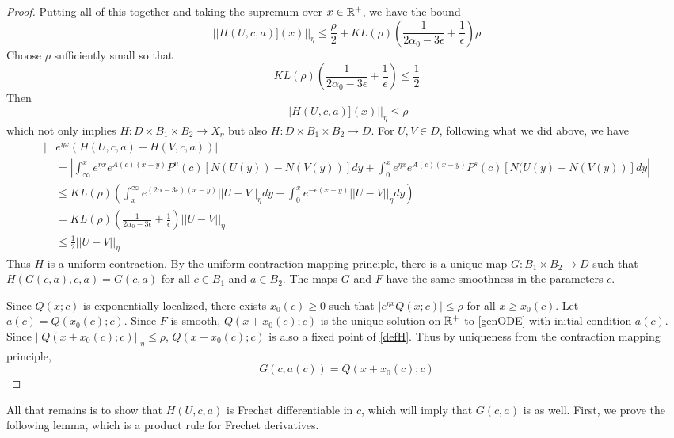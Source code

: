 \documentclass[thesis.tex]{subfiles}
\begin{document}
\begin{lemma}
\begin{proof}
Putting all of this together and taking the supremum over $x \in \mathbb{R}^+$, we have the bound
\begin{equation*}
||H(U, c, a)](x)||_\eta \leq \frac{\rho}{2} + K L(\rho) \left( \frac{1}{2 \alpha_0 - 3 \epsilon} + \frac{1}{\epsilon} \right) \rho
\end{equation*}
Choose $\rho$ sufficiently small so that 
\[
K L(\rho) \left( \frac{1}{2 \alpha_0 - 3 \epsilon} + \frac{1}{\epsilon} \right) \leq \frac{1}{2}
\]
Then 
\[
||H(U, c, a)](x)||_\eta \leq \rho
\]
which not only implies $H: D \times B_1 \times B_2 \rightarrow X_\eta$ but also $H: D \times B_1 \times B_2 \rightarrow D$. For $U, V \in D$, following what we did above, we have
\begin{align*}
| &e^{\eta x} ( H(U, c, a) - H(V, c, a) ) | \\
&= \left| \int_\infty^x e^{\eta x} e^{A(c)(x - y)}P^u(c) [N(U(y)) - N(V(y))]dy + \int_0^x e^{\eta x} e^{A(c)(x - y)}P^s(c)[N(U(y)- N(V(y))]dy \right| \\
&\leq K L(\rho) \left( \int_x^\infty e^{(2 \alpha - 3 \epsilon)(x-y)}||U - V||_\eta dy + \int_0^x e^{-\epsilon(x-y)}||U - V||_\eta dy \right) \\
&= K L(\rho) \left( \frac{1}{2 \alpha_0 - 3 \epsilon} + \frac{1}{\epsilon} \right) ||U - V||_\eta  \\
&\leq \frac{1}{2} ||U - V||_\eta 
\end{align*}
Thus $H$ is a uniform contraction. By the uniform contraction mapping principle, there is a unique map $G: B_1 \times B_2 \rightarrow D$ such that $H(G(c, a), c, a) = G(c, a)$ for all $c \in B_1$ and $a \in B_2$. The maps $G$ and $F$ have the same smoothness in the parameters $c$. 

Since $Q(x; c)$ is exponentially localized, there exists $x_0(c) \geq 0$ such that $|e^{\eta x} Q(x; c)| \leq \rho$ for all $x \geq x_0(c)$. Let $a(c) = Q(x_0(c); c)$. Since $F$ is smooth, $Q(x + x_0(c); c)$ is the unique solution on $\mathbb{R}^+$ to \eqref{genODE} with initial condition $a(c)$. Since $||Q(x + x_0(c); c)||_\eta \leq \rho$, $Q(x + x_0(c); c)$ is also a fixed point of \eqref{defH}. Thus by uniqueness from the contraction mapping principle, 
\[
G(c, a(c)) = Q(x + x_0(c); c)
\]
\end{proof}
\end{lemma}

All that remains is to show that $H(U, c, a)$ is Frechet differentiable in $c$, which will imply that $G(c, a)$ is as well. First, we prove the following lemma, which is a product rule for Frechet derivatives. 
\end{document}
